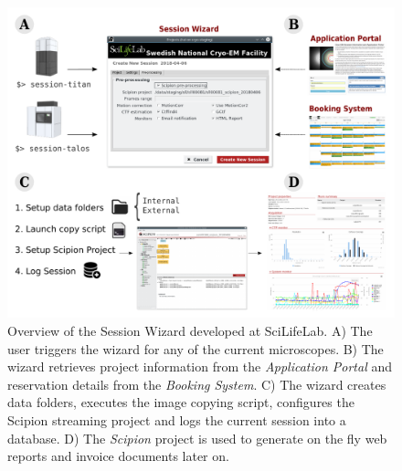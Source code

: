 \documentclass[a4paper,12pt]{article}
\def\scipion{\textit{Scipion}\xspace}
\def\scilifelab{SciLifeLab\xspace}
\begin{document}
\begin{reviewer}
\begin{figure}
\end{figure}
\begin{figure}
\includegraphics[width=1.0\textwidth]{images/scilifelab.pdf}
  \caption{Overview of the Session Wizard  developed at \scilifelab. A) The user triggers the wizard for any of the current microscopes. B) The wizard retrieves project information from the \textit{Application Portal} and reservation details from the \textit{Booking System}. C) The wizard creates data folders, executes the image copying script, configures the Scipion streaming project and logs the current session into a database. D) The \scipion project is used to generate on the fly web reports and invoice documents later on.}
  \label{fig:wizard}

\end{figure}
\clearpage




\end{reviewer}
\end{document}
